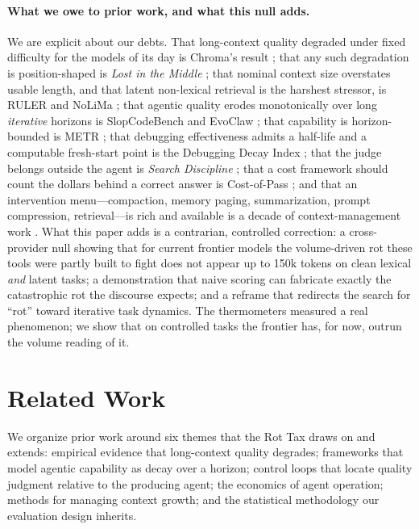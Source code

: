 \documentclass[11pt]{article}
\begin{document}
\paragraph{What we owe to prior work, and what this null adds.} We are explicit about our debts. That long-context quality degraded under fixed difficulty for the models of its day is Chroma's result \cite{hong2025contextrot}; that any such degradation is position-shaped is \emph{Lost in the Middle} \cite{liu2024lostmiddle}; that nominal context size overstates usable length, and that latent non-lexical retrieval is the harshest stressor, is RULER and NoLiMa \cite{hsieh2024ruler, modarressi2025nolima}; that agentic quality erodes monotonically over long \emph{iterative} horizons is SlopCodeBench and EvoClaw \cite{orlanski2026slopcodebench, deng2026evoclaw}; that capability is horizon-bounded is METR \cite{kwa2025metr}; that debugging effectiveness admits a half-life and a computable fresh-start point is the Debugging Decay Index \cite{adnan2025ddi}; that the judge belongs outside the agent is \emph{Search Discipline} \cite{srinivasan2026searchdiscipline}; that a cost framework should count the dollars behind a correct answer is Cost-of-Pass \cite{erol2025costofpass}; and that an intervention menu---compaction, memory paging, summarization, prompt compression, retrieval---is rich and available is a decade of context-management work \cite{packer2023memgpt, wang2023recursive, jiang2023llmlingua, jiang2024longllmlingua, lewis2020rag, chopra2026headroom, rajasekaran2025contextengineering, yan2025dontbuild}. What this paper adds is a contrarian, controlled correction: a cross-provider null showing that for current frontier models the volume-driven rot these tools were partly built to fight does not appear up to 150k tokens on clean lexical \emph{and} latent tasks; a demonstration that naive scoring can fabricate exactly the catastrophic rot the discourse expects; and a reframe that redirects the search for ``rot'' toward iterative task dynamics. The thermometers measured a real phenomenon; we show that on controlled tasks the frontier has, for now, outrun the volume reading of it.

\section{Related Work}
\label{sec:related}

We organize prior work around six themes that the Rot Tax draws on and
extends: empirical evidence that long-context quality degrades; frameworks
that model agentic capability as decay over a horizon; control loops that
locate quality judgment relative to the producing agent; the economics of
agent operation; methods for managing context growth; and the statistical
methodology our evaluation design inherits.
\end{document}
